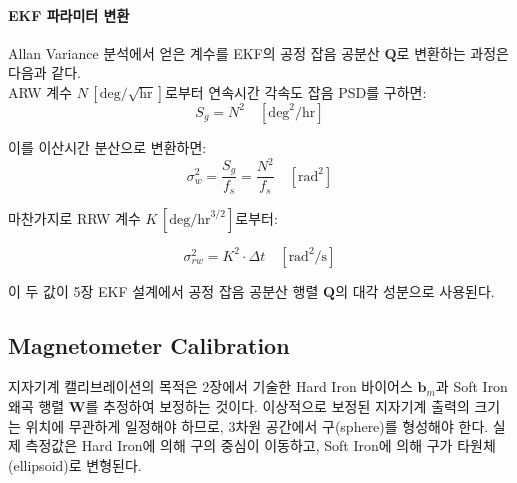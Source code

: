             \paragraph{EKF 파라미터 변환}
                Allan Variance 분석에서 얻은 계수를 EKF의 공정 잡음 공분산 $\mathbf{Q}$로 변환하는 과정은 다음과 같다.\\

                ARW 계수 $N\,[\text{deg}/\sqrt{\text{hr}}]$로부터 연속시간 각속도 잡음 PSD를 구하면:\\

                \begin{equation}
                    S_g = N^2 \quad [\text{deg}^2/\text{hr}]
                    \label{eq:arw_psd}
                \end{equation}

                이를 이산시간 분산으로 변환하면:\\

                \begin{equation}
                    \sigma_w^2 = \frac{S_g}{f_s} = \frac{N^2}{f_s} \quad [\text{rad}^2]
                    \label{eq:arw_discrete}
                \end{equation}

                마찬가지로 RRW 계수 $K\,[\text{deg}/\text{hr}^{3/2}]$로부터:

                \begin{equation}
                    \sigma_{rw}^2 = K^2 \cdot \Delta t \quad [\text{rad}^2/\text{s}]
                    \label{eq:rrw_discrete}
                \end{equation}

                이 두 값이 5장 EKF 설계에서 공정 잡음 공분산 행렬 $\mathbf{Q}$의 대각 성분으로 사용된다.\\

    \subsection{Magnetometer Calibration}
        지자기계 캘리브레이션의 목적은 2장에서 기술한 Hard Iron 바이어스 $\mathbf{b}_m$과 Soft Iron 왜곡 행렬 $\mathbf{W}$를 추정하여 보정하는 것이다. 이상적으로 보정된 지자기계 출력의 크기는 위치에 무관하게 일정해야 하므로, 3차원 공간에서 구(sphere)를 형성해야 한다. 실제 측정값은 Hard Iron에 의해 구의 중심이 이동하고, Soft Iron에 의해 구가 타원체(ellipsoid)로 변형된다.\\

